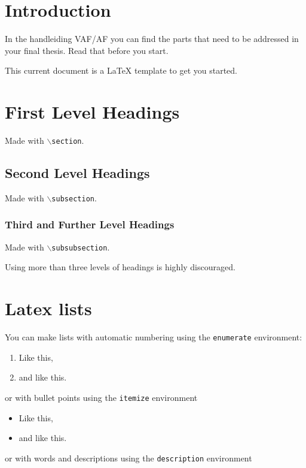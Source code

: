 \section{Introduction}
In the handleiding VAF/AF you can find the parts that need to be addressed in your final thesis. Read that before you start.

This current document is a \LaTeX{} template to get you started.


\section{First Level Headings}

Made with {\tt $\backslash$section}.

\subsection{Second Level Headings}

Made with {\tt $\backslash$subsection}.

\subsubsection{Third and Further Level Headings}

Made with {\tt $\backslash$subsubsection}.


Using more than three levels of headings is highly discouraged.


\section{Latex lists}

You can make lists with automatic numbering using the {\tt enumerate} environment:

\begin{enumerate} 
\item Like this,
\item and like this.
\end{enumerate}

or with bullet points using the {\tt itemize} environment

\begin{itemize} 
\item Like this,
\item and like this.
\end{itemize}

or with words and descriptions 
using the {\tt description} environment

